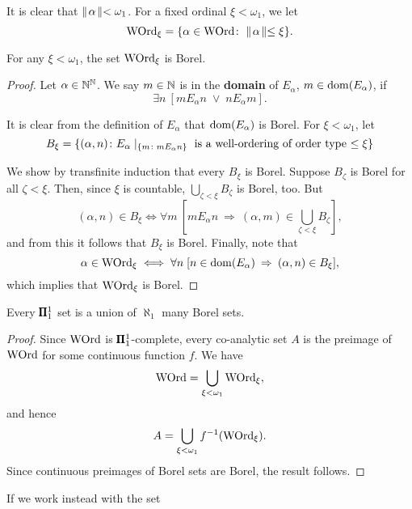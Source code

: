 It is clear that $\parallel \! \alpha \!\parallel < \omega_1$. For a fixed ordinal $\xi < \omega_1$, we let
\begin{equation*}
\operatorname{WOrd}_\xi = \{ \alpha \in \operatorname{WOrd} \colon \parallel \! \alpha \!\parallel \leq \xi \}.
\end{equation*}

\begin{lemma}\label{lem-bounded-rank-borel}For any $\xi < \omega_1$, the set $\operatorname{WOrd}_\xi$ is Borel.

\end{lemma}\begin{proof}Let $\alpha \in \mathbb{N}^{\mathbb{N}}$. We say $m \in \mathbb{N}$ is in the \textbf{domain} of $E_\alpha$, $m \in \operatorname{dom}(E_\alpha)$, if
\begin{equation*}
\exists n \: [ m E_\alpha n \; \vee \; n E_\alpha m].
\end{equation*}

It is clear from the definition of $E_\alpha$ that $\operatorname{dom}(E_\alpha)$ is Borel. For $\xi < \omega_1$, let
\begin{equation*}
B_\xi = \{ (\alpha,n) \colon E_\alpha \mid_{\{m \colon m E_\alpha n\}} \text{ is a well-ordering of order type $\leq \xi$} \}
\end{equation*}

We show by transfinite induction that every $B_\xi$ is Borel. Suppose $B_\zeta$ is Borel for all $\zeta < \xi$. Then, since $\xi$ is countable, $\bigcup_{\zeta < \xi} B_\zeta$ is Borel, too. But
\begin{equation*}
(\alpha,n) \in B_\xi \iff \forall m \: [m E_\alpha n \: \Rightarrow \: (\alpha,m) \in \bigcup_{\zeta < \xi} B_\zeta],
\end{equation*}
and from this it follows that $B_\xi$ is Borel. Finally, note that
\begin{equation*}
\alpha \in \operatorname{WOrd}_\xi \iff \forall n \; [n \in \operatorname{dom}(E_\alpha) \: \Rightarrow \: (\alpha,n) \in B_\xi],
\end{equation*}
which implies that $\operatorname{WOrd}_\xi$ is Borel.

\end{proof}\begin{corollary}\label{cor-coanal-union-borel}Every $\pmb{\Pi}^1_{1}$ set is a union of $\aleph_1$ many Borel sets.

\end{corollary}\begin{proof}Since $\operatorname{WOrd}$ is $\pmb{\Pi}^1_{1}$-complete, every co-analytic set $A$ is the preimage of $\operatorname{WOrd}$ for some continuous function $f$. We have
\begin{equation*}
\operatorname{WOrd} = \bigcup_{\xi < \omega_1} \operatorname{WOrd}_\xi,
\end{equation*}
and hence
\begin{equation*}
A = \bigcup_{\xi < \omega_1}  f^{-1}(\operatorname{WOrd}_\xi).
\end{equation*}
Since continuous preimages of Borel sets are Borel, the result follows.

\end{proof}If we work instead with the set
